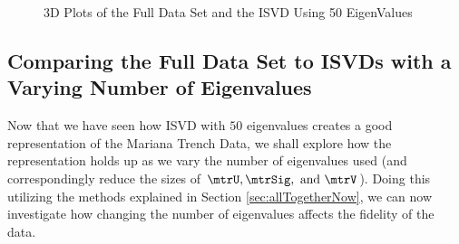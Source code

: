 \begin{figure}[H]
    \centering
    \qquad
    \caption{3D Plots of the Full Data Set and the ISVD Using 50 EigenValues}%
    \label{fig:503D}%
\end{figure}


\subsection{Comparing the Full Data Set to ISVDs with a Varying Number of Eigenvalues}\label{sec:comparingISVDFAllGraphs}
Now that we have seen how ISVD with $50$ eigenvalues creates a good representation
of the Mariana Trench Data, we shall explore how the representation holds up as we vary the number of
eigenvalues used (and correspondingly reduce the sizes of $\mtrU,\mtrSig,\text{ and  }\mtrV$).
Doing this utilizing the methods explained in Section \ref{sec:allTogetherNow}, we can now investigate how changing the number of eigenvalues affects the fidelity of the data.

